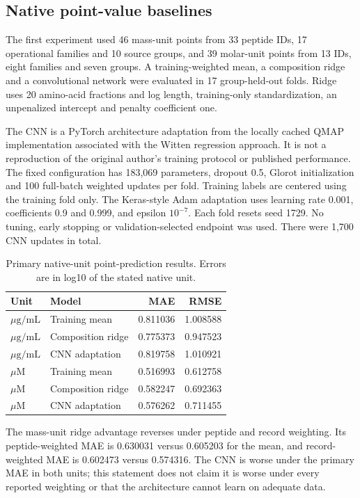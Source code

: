 \documentclass[12pt,a4paper]{article}
\newcommand{\ug}{\ensuremath{\mu\mathrm{g}/\mathrm{mL}}}
\begin{document}
\subsection{Native point-value baselines}
The first experiment used 46 mass-unit points from 33 peptide IDs, 17 operational families and 10 source groups, and 39 molar-unit points from 13 IDs, eight families and seven groups. A training-weighted mean, a composition ridge and a convolutional network were evaluated in 17 group-held-out folds. Ridge uses 20 amino-acid fractions and log length, training-only standardization, an unpenalized intercept and penalty coefficient one.

The CNN is a PyTorch architecture adaptation from the locally cached QMAP implementation associated with the Witten regression approach. It is not a reproduction of the original author's training protocol or published performance. The fixed configuration has 183,069 parameters, dropout 0.5, Glorot initialization and 100 full-batch weighted updates per fold. Training labels are centered using the training fold only. The Keras-style Adam adaptation uses learning rate 0.001, coefficients 0.9 and 0.999, and epsilon $10^{-7}$. Each fold resets seed 1729. No tuning, early stopping or validation-selected endpoint was used. There were 1,700 CNN updates in total.

\begin{table}[htbp]\centering\singlespacing
\caption{Primary native-unit point-prediction results. Errors are in log10 of the stated native unit.}
\begin{tabular}{llrr}\toprule
Unit & Model & MAE & RMSE\\\midrule
\ug & Training mean & 0.811036 & 1.008588\\
\ug & Composition ridge & 0.775373 & 0.947523\\
\ug & CNN adaptation & 0.819758 & 1.010921\\
$\mu$M & Training mean & 0.516993 & 0.612758\\
$\mu$M & Composition ridge & 0.582247 & 0.692363\\
$\mu$M & CNN adaptation & 0.576262 & 0.711455\\\bottomrule
\end{tabular}\end{table}
The mass-unit ridge advantage reverses under peptide and record weighting. Its peptide-weighted MAE is 0.630031 versus 0.605203 for the mean, and record-weighted MAE is 0.602473 versus 0.574316. The CNN is worse under the primary MAE in both units; this statement does not claim it is worse under every reported weighting or that the architecture cannot learn on adequate data.
\end{document}
